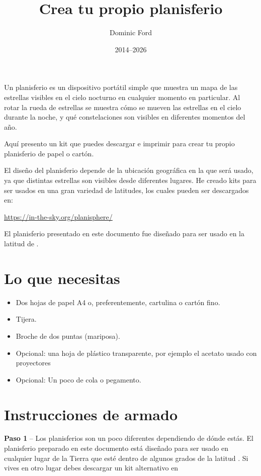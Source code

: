 \documentclass[a4paper,onecolumn,10pt]{article}
\title{Crea tu propio planisferio}
\author{Dominic Ford}
\date{2014--2026}
\begin{document}
\maketitle
\setcounter{footnote}{1}

Un planisferio es un dispositivo portátil simple que muestra un mapa de las estrellas visibles
en el cielo nocturno en cualquier momento en particular. Al rotar la rueda de estrellas se muestra
cómo se mueven las estrellas en el cielo durante la noche, y qué constelaciones son visibles
en diferentes momentos del año.

Aquí presento un kit que puedes descargar e imprimir para crear tu propio
planisferio de papel o cartón.

El diseño del planisferio depende de la ubicación geográfica en la que será usado,
ya que distintas estrellas son visibles desde diferentes lugares. He creado kits
para ser usados en una gran variedad de latitudes, los cuales pueden ser descargados en:

\url{https://in-the-sky.org/planisphere/}

El planisferio presentado en este documento fue diseñado para ser usado en la latitud de
.

\section*{Lo que necesitas}

\begin{itemize}
\item Dos hojas de papel A4 o, preferentemente, cartulina o cartón fino.
\item Tijera.
\item Broche de dos puntas (mariposa).
\item Opcional: una hoja de plástico transparente, por ejemplo el acetato usado con proyectores
\item Opcional: Un poco de cola o pegamento.
\end{itemize}

\section*{Instrucciones de armado}

{\bf Paso 1} -- Los planisferios son un poco diferentes dependiendo de dónde estás.
El planisferio preparado en este documento está diseñado para ser usado en cualquier
lugar de la Tierra que esté dentro de algunos grados de la latitud .
Si vives en otro lugar debes descargar un kit alternativo en
\end{document}
